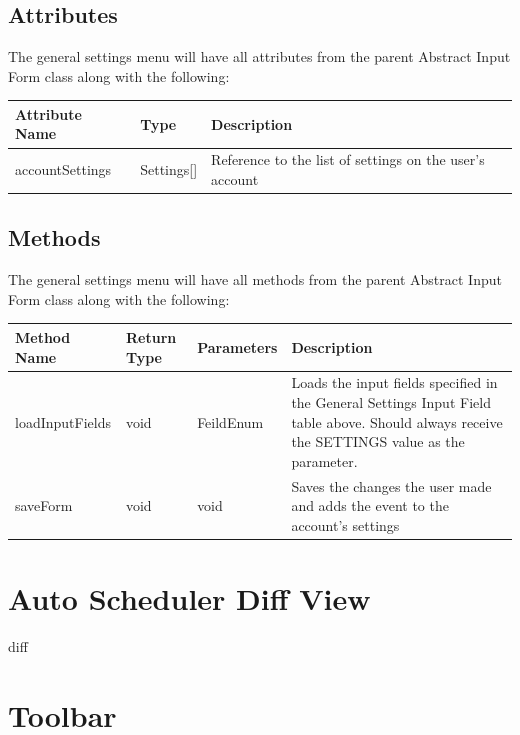 \documentclass{scrreprt}
\begin{document}
\subsection{Attributes}

The general settings menu will have all attributes from the parent Abstract Input Form class along with the following:

\begin{center}
\begin{longtable}{ | p{3cm} | p{3cm} | p{9cm} | }
\hline
\textbf{Attribute Name} & \textbf{Type} & \textbf{Description} \\
\hline
accountSettings & Settings[] & Reference to the list of settings on the user's account \\
\hline
\end{longtable}
\end{center}

\subsection{Methods}

The general settings menu will have all methods from the parent Abstract Input Form class along with the following:

\begin{center}
\begin{longtable}{ | p{3cm} | p{2cm} | p{2cm} | p{8cm} | }
\hline
\textbf{Method Name} & \textbf{Return Type} & \textbf{Parameters} & \textbf{Description} \\
\hline
loadInputFields & void & FeildEnum & Loads the input fields specified in the General Settings Input Field table above. Should always receive the SETTINGS value as the parameter.\\
\hline
saveForm & void & void & Saves the changes the user made and adds the event to the account's settings \\
\hline
\end{longtable}
\end{center}

\section{Auto Scheduler Diff View}

diff

\section{Toolbar}
\end{document}
